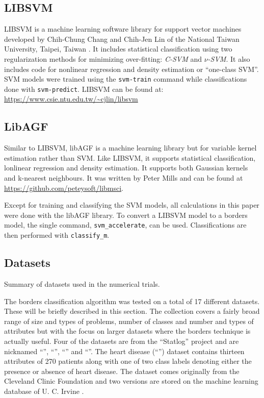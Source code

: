 \subsection{LIBSVM}

LIBSVM is a machine learning software library for support vector machines 
developed by Chih-Chung Chang and Chih-Jen Lin of 
the National Taiwan University, Taipei, Taiwan \citep{Chang_Lin2011}.
It includes statistical classification using two regularization methods 
for minimizing over-fitting: 
{\it C-SVM} and {\it $\nu$-SVM}.
It also includes code for nonlinear regression and density estimation or
``one-class SVM''.
SVM models were trained using the \verb/svm-train/ command while
classifications done with \verb/svm-predict/.
LIBSVM can be found at: \url{https://www.csie.ntu.edu.tw/~cjlin/libsvm}

\subsection{LibAGF}

Similar to LIBSVM, libAGF is a machine learning library but for variable kernel 
estimation \citep{Mills2011,Terrell_Scott1992} rather than SVM.
Like LIBSVM, it supports statistical classification, lonlinear regression
and density estimation.
It supports both Gaussian kernels and k-nearest neighbours.
It was written by Peter Mills and can be found at
\url{https://github.com/peteysoft/libmsci}.

Except for training and classifying the SVM models, all calculations in this paper were done 
with the libAGF library. To convert a LIBSVM model to a borders model,
the single command, \verb/svm_accelerate/, can be used.
Classifications are then performed with \verb/classify_m/.

\subsection{Datasets}

\label{datasets}

\begin{table}
	\caption{Summary of datasets used in the numerical trials.}
	\label{summary}
	
\end{table}

The borders classification algorithm was tested on a total of 
17 different datasets.
These will be briefly described in this section.
The collection covers a fairly broad range of size and types of problems, 
number of classes and number and types of attributes but with
the focus on larger datasets where the borders technique is actually useful.
Four of the datasets are from
the ``Statlog'' project \citep{Michie_etal1994,King_etal1995} 
and are nicknamed ``'', ``'', ``'' and ``''.
The heart disease (``'') dataset 
contains thirteen attributes of 270 patients along with one of two class labels denoting either the presence or absence of heart disease.
The dataset comes originally from the Cleveland Clinic Foundation and two versions are stored on the machine learning database of U. C. Irvine \citep{Lichman2013}.

